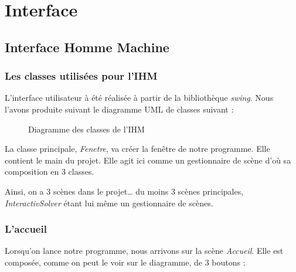 \chapter{Interface}
\section{Interface Homme Machine}
\subsection{Les classes utilisées pour l'IHM}
L’interface utilisateur à été réalisée à partir de la bibliothèque \textit{swing}. Nous l’avons produite suivant le diagramme UML de classes suivant :

 \begin{figure}[h]
 \begin{center}
 \end{center}
     \caption{Diagramme des classes de l'IHM}
 \end{figure}


La classe principale, \textit{Fenetre}, va créer la fenêtre de notre programme. Elle contient le main du projet.
Elle agit ici comme un gestionnaire de scène d’où sa composition en 3 classes.

Ainsi, on a 3 scènes dans le projet… du moins 3 scènes principales, \textit{InteractivSolver} étant lui même un gestionnaire de scènes.

\subsection{L'accueil}
Lorsqu’on lance notre programme, nous arrivons sur la scène \textit{Accueil}. Elle est composée, comme on peut le voir sur le diagramme, de 3 boutons :

